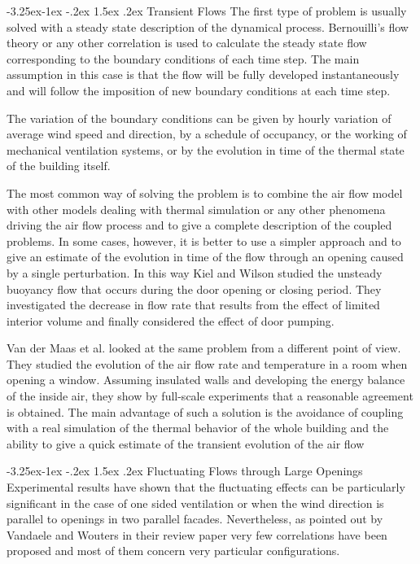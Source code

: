 \documentclass[12pt]{report}
\makeatletter
\renewcommand\subparagraph{\@startsection{subparagraph}{5}{\z@}%
                                         {-3.25ex\@plus -1ex \@minus -.2ex}%
                                         {1.5ex \@plus .2ex}
                                         {\normalfont\normalsize\bfseries}}
\makeatother
\begin{document}
\subparagraph{Transient Flows}
The first type of problem is usually solved with a steady state description of the
dynamical process. Bernouilli’s flow theory or any other correlation is used to
calculate the steady state flow corresponding to the boundary conditions of each
time step. The main assumption in this case is that the flow will be fully
developed instantaneously and will follow the imposition of new boundary conditions at each time step.

The variation of the boundary conditions can be given by hourly variation of
average wind speed and direction, by a schedule of occupancy, or the working of
mechanical ventilation systems, or by the evolution in time of the thermal state of
the building itself.

The most common way of solving the problem is to combine the air flow model
with other models dealing with thermal simulation or any other phenomena driving the air flow process and to give a complete description of the coupled problems. In some cases, however, it is better to use a simpler approach and to give
an estimate of the evolution in time of the flow through an opening caused by a 
single perturbation. In this way Kiel and Wilson \cite{kiel_wilson_1986} studied the unsteady buoyancy flow that occurs during the door opening or closing period. They investigated the decrease in flow rate that results from the effect of limited interior
volume and finally considered the effect of door pumping.

Van der Maas et al. \cite{vandermaas_et_al_1989} looked at the same problem from a different point of
view. They studied the evolution of the air flow rate and temperature in a room
when opening a window. Assuming insulated walls and developing the energy
balance of the inside air, they show by full-scale experiments that a reasonable
agreement is obtained. The main advantage of such a solution is the avoidance of
coupling with a real simulation of the thermal behavior of the whole building and
the ability to give a quick estimate of the transient evolution of the air flow

\subparagraph{Fluctuating Flows through Large Openings}
Experimental results have shown that the fluctuating effects can be particularly
significant in the case of one sided ventilation or when the wind direction is parallel to openings in two parallel facades.
Nevertheless, as pointed out by Vandaele and Wouters \cite{vandaele_wouters_1989} in their
review paper very few correlations have been proposed
and most of them concern very particular configurations.
\end{document}
